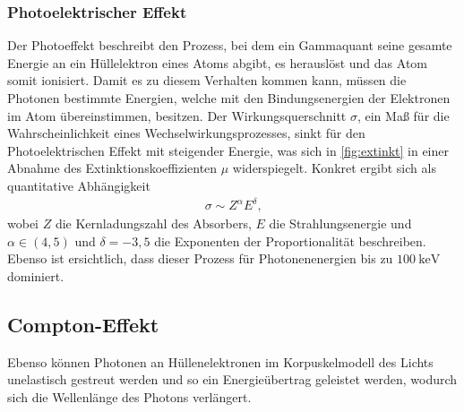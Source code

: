 \subsubsection{Photoelektrischer Effekt}
Der Photoeffekt beschreibt den Prozess, bei dem ein Gammaquant seine gesamte Energie an ein Hüllelektron eines Atoms abgibt, es herauslöst und das Atom somit ionisiert. Damit es zu diesem Verhalten kommen kann, müssen die Photonen bestimmte Energien, welche mit den Bindungsenergien der Elektronen im Atom übereinstimmen, besitzen.
Der Wirkungsquerschnitt $\sigma$, ein Maß für die Wahrscheinlichkeit eines Wechselwirkungsprozesses, sinkt für den Photoelektrischen Effekt mit steigender Energie, was sich in \autoref{fig:extinkt} in einer Abnahme des Extinktionskoeffizienten $\mu$ widerspiegelt.
Konkret ergibt sich als quantitative Abhängigkeit 
\begin{align}
  \sigma \sim Z^\alpha E^\delta\text{,}
\end{align}
wobei $Z$ die Kernladungszahl des Absorbers, $E$ die Strahlungsenergie und $\alpha \in(4,5)$ und $\delta = -3,5$ die Exponenten der Proportionalität beschreiben.
Ebenso ist ersichtlich, dass dieser Prozess für Photonenenergien bis zu $\SI{100}{\kilo\electronvolt}$ dominiert.

\subsection{Compton-Effekt}
Ebenso können Photonen an Hüllenelektronen im Korpuskelmodell des Lichts unelastisch gestreut werden und so ein Energieübertrag geleistet werden, wodurch sich die Wellenlänge des Photons verlängert. 
